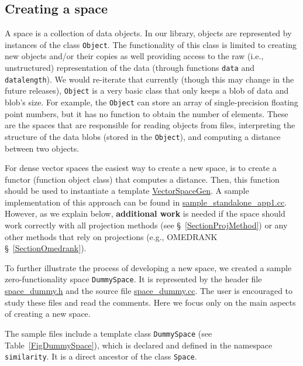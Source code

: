 \documentclass[runningheads,a4paper]{llncs}
\newcommand{\replocfile}{https://github.com/searchivarius/nmslib/blob/v1.5/}
\newcommand{\ttt}[1]{\texttt{#1}}
\begin{document}
\subsection{Creating a space}\label{SectionCreateSpace}
A space is a collection of data objects.
In our library, objects are represented by instances
of the class \ttt{Object}.
The functionality of this class is limited to
creating new objects and/or their copies as well providing
access to the raw (i.e., unstructured) representation of the data
(through functions \ttt{data} and \ttt{datalength}).
We would re-iterate that currently (though this may change in the future releases),
\ttt{Object} is a very basic class that only keeps a blob of data and blob's size.
For example, the \ttt{Object} can store an array of single-precision floating point
numbers, but it has no function to obtain the number of elements.
These are the spaces that are responsible for reading objects from files,
interpreting the structure of the data blobs (stored in the \ttt{Object}), 
and computing a distance between two objects.


For dense vector spaces the easiest way to create a new space,
is to create a functor (function object class) that computes a distance.
Then, this function should be used to instantiate a template
\href{\replocfile similarity_search/include/space/space_vector_gen.h}{VectorSpaceGen}.
A sample implementation of this approach can be found
in \href{\replocfile sample_standalone_app/sample_standalone_app1.cc#L114}{sample\_standalone\_app1.cc}.
However, as we explain below, \textbf{additional work} is needed if the space should work correctly with all projection methods 
(see \S~\ref{SectionProjMethod}) or any other methods that rely on projections (e.g., OMEDRANK \S~\ref{SectionOmedrank}).

To further illustrate the process of developing a new space,
we created a sample zero-functionality space \ttt{DummySpace}.
It is represented by 
the header file 
\href{\replocfile  similarity_search/include/space/space_dummy.h}{space\_dummy.h}
and the source file
\href{\replocfile similarity_search/src/space/space_dummy.cc}{space\_dummy.cc}.
The user is encouraged to study these files and read the comments.
Here we focus only on the main aspects of creating a new space.

The sample files include a template class \ttt{DummySpace} (see Table~\ref{FigDummySpace}), 
which is declared and defined in the namespace \ttt{similarity}.
It is a direct ancestor of the class \ttt{Space}.
\end{document}
